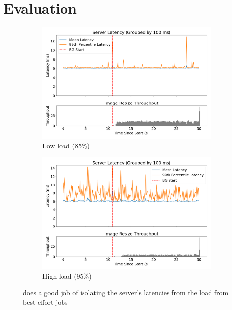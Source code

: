 \section{Evaluation}

\begin{figure}[t]
    \centering
    \begin{subfigure}{\columnwidth}
        \includegraphics[width=\columnwidth]{graphs/srv-bg-schedbe-low.png}
        \caption{Low load (85\%)}\label{fig:srv-bg-schedbe-low}
        \vspace{12pt}
    \end{subfigure}
    \begin{subfigure}{\columnwidth}
        \includegraphics[width=\columnwidth]{graphs/srv-bg-schedbe-high.png}
        \caption{High load (95\%)}\label{fig:srv-bg-schedbe-high}
    \end{subfigure}
    \vspace{4pt}
    \caption{ \beclass{} does a good job of isolating the server's latencies
     from the load from best effort jobs}\label{fig:srv-bg-schedbe}
\end{figure}

